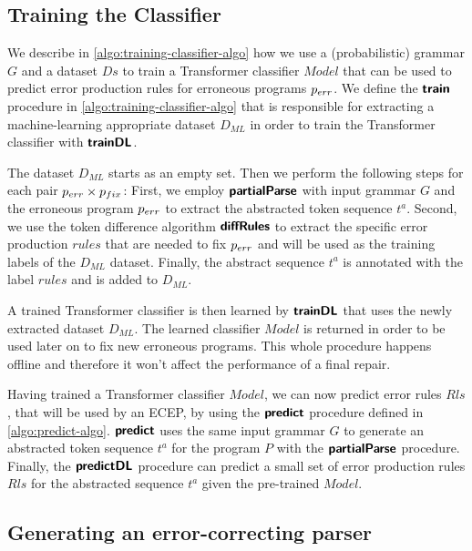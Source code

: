 \subsection{Training the Classifier}
\label{sec:whole-system:training-classifier}



We describe in \autoref{algo:training-classifier-algo} how we use a
(probabilistic) grammar $G$ and a dataset $Ds$ to train a Transformer classifier
$Model$ that can be used to predict error production rules for erroneous
programs $p_{err}$. We define the $\bm{\mathsf{train}}$ procedure in
\autoref{algo:training-classifier-algo} that is responsible for extracting a
machine-learning appropriate dataset $D_{ML}$ in order to train the Transformer
classifier with $\bm{\mathsf{trainDL}}$.

The dataset $D_{ML}$ starts as an empty set. Then we perform the following steps
for each pair $p_{err} \times p_{fix}$: First, we employ $\bm{\mathsf{partialParse}}$ with input
grammar $G$ and the erroneous program $p_{err}$ to extract the abstracted token
sequence $t^a$. Second, we use the token difference algorithm $\bm{\mathsf{diffRules}}$ to
extract the specific error production $rules$ that are needed to fix $p_{err}$ and
will be used as the training labels of the $D_{ML}$ dataset. Finally, the
abstract sequence $t^a$ is annotated with the label $rules$ and is added to
$D_{ML}$.

A trained Transformer classifier is then learned by $\bm{\mathsf{trainDL}}$ that uses the
newly extracted dataset $D_{ML}$. The learned classifier $Model$ is returned in
order to be used later on to fix new erroneous programs. This whole procedure
happens offline and therefore it won't affect the performance of a final repair.



Having trained a Transformer classifier $Model$, we can now predict error rules
$Rls$, that will be used by an ECEP, by using the $\bm{\mathsf{predict}}$ procedure
defined in \autoref{algo:predict-algo}. $\bm{\mathsf{predict}}$ uses the same input
grammar $G$ to generate an abstracted token sequence $t^a$ for the program $P$
with the $\bm{\mathsf{partialParse}}$ procedure. Finally, the $\bm{\mathsf{predictDL}}$ procedure can
predict a small set of error production rules $Rls$ for the abstracted sequence
$t^a$ given the pre-trained $Model$.

\subsection{Generating an error-correcting parser}
\label{sec:whole-system:building-ecp}

